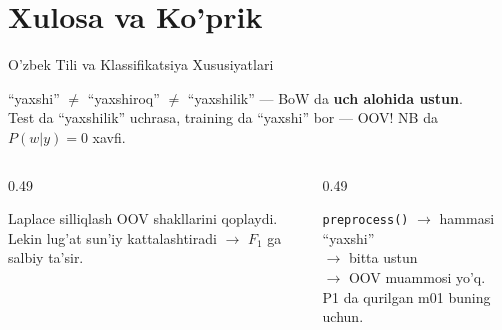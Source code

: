 \documentclass[aspectratio=169,11pt]{beamer}
\begin{document}
\section[Xulosa]{Xulosa va Ko'prik}

\begin{frame}{O'zbek Tili va Klassifikatsiya Xususiyatlari}
  \begin{tcolorbox}[warnbox,title=Agglutinasiya va BoW muammosi]
    \small
    ``yaxshi'' $\neq$ ``yaxshiroq'' $\neq$ ``yaxshilik'' ---
    BoW da \textbf{uch alohida ustun}.\\
    Test da ``yaxshilik'' uchrasa, training da ``yaxshi'' bor ---
    OOV! NB da $P(w|y){=}0$ xavfi.
  \end{tcolorbox}
  \vspace{4pt}
  \begin{columns}[T]
    \begin{column}{0.49\textwidth}
      \begin{tcolorbox}[defbox,title=NB yondashuvi]
        \small
        Laplace silliqlash OOV shakllarini
        qoplaydi.\\
        Lekin lug'at sun'iy kattalashtiradi
        $\to$ $F_1$ ga salbiy ta'sir.
      \end{tcolorbox}
    \end{column}
    \begin{column}{0.49\textwidth}
      \begin{tcolorbox}[okbox,title=Yechim: m01 preprocessing]
        \small
        \texttt{preprocess()} $\to$ hammasi ``yaxshi''\\
        $\to$ bitta ustun\\
        $\to$ OOV muammosi yo'q.\\
        \textcolor{halfgray}{\footnotesize
          P1 da qurilgan m01 buning uchun.}
      \end{tcolorbox}
    \end{column}
  \end{columns}
\end{frame}
\end{document}
